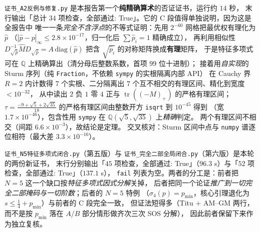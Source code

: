 \documentclass[UTF8,11pt]{ctexart}
\theoremstyle{definition}
\newcommand{\tr}{\operatorname{tr}}
\newcommand{\Q}{\mathbb{Q}}
\begin{document}
\texttt{证书\_A2反例与修复.py} 是本报告第一个\textbf{纯精确算术}的否证证书，运行约 $14$ 秒，
末行输出「总计 $34$ 项检查，全部通过: True」。它的 C 段值得单独说明，因为这是全报告中
唯一一条\emph{完全不含浮点}的不等式证明：先用 $2^{-60}$ 网格把最优权有理化为 $\hat p$
（$|\hat p-p|_\infty\le2.8\times10^{-17}$，归一化后 $\sum\hat p_i=1$ 精确成立），
再利用相似性 $D_{\sqrt{\hat p}}^{-1}\hat M D_{\sqrt{\hat p}}=A\,\mathrm{diag}(\hat p)$
把含 $\sqrt{\hat p_i}$ 的对称矩阵换成\textbf{有理}矩阵，
于是特征多项式可在 $\Q$ 上精确算出（清分母后整数系数，首项 $99$ 位十进制）；
接着用\emph{自实现}的 Sturm 序列（纯 \texttt{Fraction}，不依赖 \texttt{sympy} 的实根隔离内部 API）
在 Cauchy 界 $R=2$ 内计数得 $7$ 个实根、二分隔离出 $7$ 个互不相交的有理区间、精化到宽度 $<10^{-32}$，
从中读出 $2$ 负 $1$ 零 $4$ 正与 $\tr((-M)_+)$ 的严格有理区间；
$\tau=\frac{-9+\sqrt5+2\sqrt{35}}{18}$ 的严格有理区间由整数开方 \texttt{isqrt} 到 $10^{-45}$ 得到
（宽 $1.7\times10^{-46}$），包含性用 \texttt{sympy} 在 $\Q(\sqrt5,\sqrt{35})$ 上\emph{精确}判定。
两个有理区间不相交（间距 $6.6\times10^{-3}$），故结论是定理。
交叉核对：Sturm 区间中点与 \texttt{numpy} 谱逐位相符（最大差 $3.3\times10^{-16}$）。

\texttt{证书\_N5特征多项式闭合.py}（第五版）与 \texttt{证书\_完全二部全局闭合.py}（第六版）是本轮的两份新证书，
末行分别输出「$45$ 项检查，全部通过: True」（$96.3$ s）与「$52$ 项检查，全部通过: True」（$137.1$ s），
\texttt{fail} 列表为空。两者的分工是：前者把 $N=5$ 这一个缺口按\emph{特征多项式因式分解}关掉，
后者把同一个论证\emph{推广到一切完全二部掩码与一切阶数}；后者的 $N=5$ 特例
（$\sigma_4(p)=p_{\min}$，核心引理退化为 $s\le\frac14+p_{\min}$）与前者的 C 段完全一致，
但证法短得多（Titu $+$ AM--GM 两行，而不是按 $p_{\min}$ 落在 $A/B$ 部分情形做齐次三次 SOS 分解），
因此前者保留下来作为独立复核。
\end{document}
